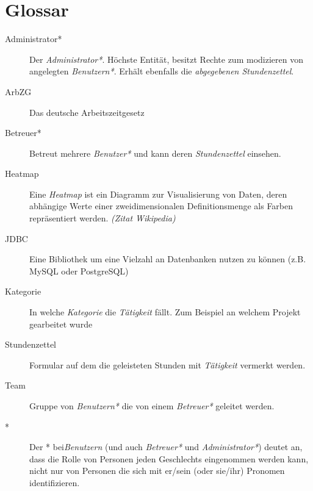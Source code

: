 \section{Glossar}
\begin{description}
	\item[Administrator*] Der \emph{Administrator*}. Höchste Entität, besitzt Rechte zum modizieren von angelegten \emph{Benutzern*}.
	               Erhält ebenfalls die \emph{abgegebenen Stundenzettel}.

	\item[ArbZG] Das deutsche Arbeitszeitgesetz

	\item[Betreuer*] Betreut mehrere \emph{Benutzer*} und kann deren \emph{Stundenzettel} einsehen.

	\item[Heatmap] Eine \emph{Heatmap} ist ein Diagramm zur Visualisierung von Daten, deren abhängige Werte einer zweidimensionalen Definitionsmenge als Farben repräsentiert werden.  \emph{(Zitat Wikipedia)}

	\item[JDBC] Eine Bibliothek um eine Vielzahl an Datenbanken nutzen zu können (z.B. MySQL oder PostgreSQL)

	\item[Kategorie] In welche \emph{Kategorie} die \emph{Tätigkeit} fällt. Zum Beispiel an welchem Projekt gearbeitet wurde

	\item[Stundenzettel] Formular auf dem die geleisteten Stunden mit \emph{Tätigkeit} vermerkt werden.

	\item[Team] Gruppe von \emph{Benutzern*} die von einem \emph{Betreuer*} geleitet werden.
	\item[*] Der * bei\emph{Benutzern} (und auch \emph{Betreuer*} und \emph{Administrator*}) deutet an, dass die Rolle von Personen jeden Geschlechts eingenommen werden kann, nicht nur von Personen die sich mit er/sein (oder sie/ihr) Pronomen identifizieren.

\end{description}
